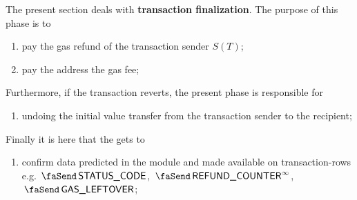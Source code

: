 The present section deals with \textbf{transaction finalization}.
The purpose of this phase is to
\begin{enumerate}
	\item pay the gas refund of the transaction sender $S(T)$;
	\item pay the  address the gas fee;
\end{enumerate}
Furthermore, if the transaction reverts, the present phase is responsible for
\begin{enumerate}[resume]
	\item undoing the initial value transfer from the transaction sender to the recipient;
\end{enumerate}
Finally it is here that the \hubMod{} gets to
\begin{enumerate}[resume]
	\item confirm data predicted in the \txnDataMod{} module and made available on transaction-rows e.g.
		$\txStatusCode$,
		$\txFinalRefundCounter$,
		$\txLeftoverGas$;
\end{enumerate}
